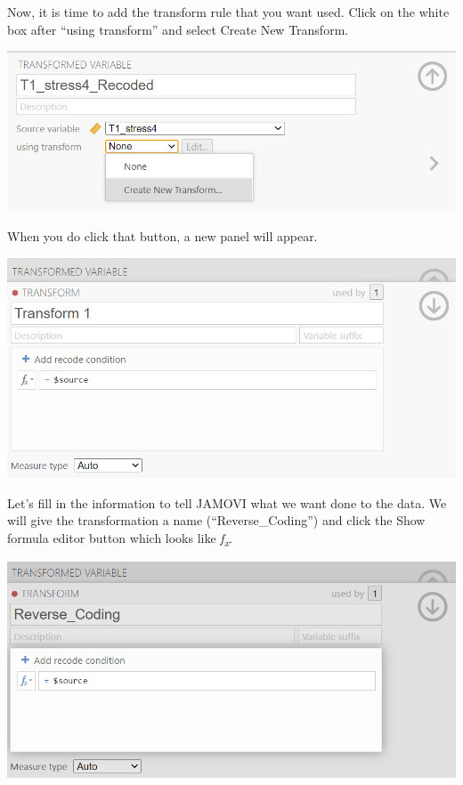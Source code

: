 \documentclass[
]{book}
\begin{document}
Now, it is time to add the transform rule that you want used. Click on the white box after ``using transform'' and select {Create New Transform}.

\includegraphics{img/StressScale_TransformationToRecodeT1Stress4.png}

When you do click that button, a new panel will appear.

\includegraphics{img/StressScale_TransformationToRecodeT1Stress4_2.png}

Let's fill in the information to tell JAMOVI what we want done to the data. We will give the transformation a name (``Reverse\_Coding'') and click the {Show formula editor} button which looks like \emph{f\textsubscript{x}}.

\includegraphics{img/StressScale_TransformationToRecodeT1Stress4_3.png}
\end{document}
